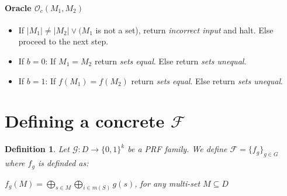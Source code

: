 \documentclass{article}
\newtheorem{definition}{Definition}
\newcommand{\funcfamily}{\mathcal{F}}
\newcommand{\XOR}{\bigoplus}
\begin{document}
\paragraph{Oracle $\mathcal{O}_c(M_1,M_2)$}
\begin{itemize}
    \item If $|M_1| \neq |M_2| \vee (M_1$ is not a set), return \emph{incorrect input} and halt. Else proceed to the next step.
    \item If $b=0$: If $M_1 = M_2$ return \emph{sets equal}. Else return \emph{sets unequal}.
    \item If $b=1$: If $f(M_1) = f(M_2)$ return \emph{sets equal}. Else return \emph{sets unequal}.
\end{itemize}

\section{Defining a concrete $\funcfamily$}

\begin{definition}
Let $\mathcal{G} : D \rightarrow \{0,1\}^k$ be a PRF family. We define $\funcfamily=\{f_g\}_{g \in G}$ where $f_g$ is definded as:

$ f_g(M)=\XOR_{s\in M} \XOR_{i \in m(S)} g(s)$, for any multi-set $M \subseteq D$
\end{definition}
\end{document}
